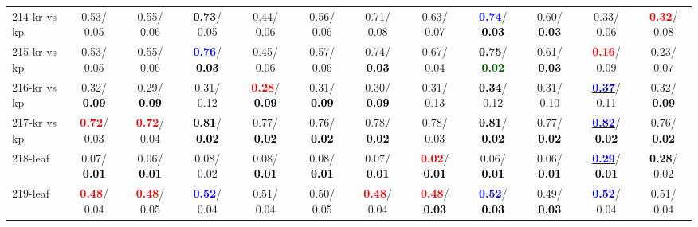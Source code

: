 \begin{table}[h]
\begin{center}
{\begin{tabular}{lc|c|c|c|c|c|c|c|c|c|c}
214-kr vs kp &   0.53/  0.05 &   0.55/  0.06 & \textcolor{black}{\textbf{  0.73}}/  0.05 &   0.44/  0.06 &   0.56/  0.06 &   0.71/  0.08 &   0.63/  0.07 & \underline{\textcolor{blue}{\textbf{  0.74}}}/\textcolor{black}{\textbf{  0.03}} &   0.60/\textcolor{black}{\textbf{  0.03}} &   0.33/  0.06 & \textcolor{red}{\textbf{  0.32}}/  0.08 \\
215-kr vs kp &   0.53/  0.05 &   0.55/  0.06 & \underline{\textcolor{blue}{\textbf{  0.76}}}/\textcolor{black}{\textbf{  0.03}} &   0.45/  0.06 &   0.57/  0.06 &   0.74/\textcolor{black}{\textbf{  0.03}} &   0.67/  0.04 & \textcolor{black}{\textbf{  0.75}}/\textcolor{darkgreen}{\textbf{  0.02}} &   0.61/\textcolor{black}{\textbf{  0.03}} & \textcolor{red}{\textbf{  0.16}}/  0.09 &   0.23/  0.07 \\
216-kr vs kp &   0.32/\textcolor{black}{\textbf{  0.09}} &   0.29/\textcolor{black}{\textbf{  0.09}} &   0.31/  0.12 & \textcolor{red}{\textbf{  0.28}}/\textcolor{black}{\textbf{  0.09}} &   0.31/\textcolor{black}{\textbf{  0.09}} &   0.30/\textcolor{black}{\textbf{  0.09}} &   0.31/  0.13 & \textcolor{black}{\textbf{  0.34}}/  0.12 &   0.31/  0.10 & \underline{\textcolor{blue}{\textbf{  0.37}}}/  0.11 &   0.32/\textcolor{black}{\textbf{  0.09}} \\
217-kr vs kp & \textcolor{red}{\textbf{  0.72}}/  0.03 & \textcolor{red}{\textbf{  0.72}}/  0.04 & \textcolor{black}{\textbf{  0.81}}/\textcolor{black}{\textbf{  0.02}} &   0.77/\textcolor{black}{\textbf{  0.02}} &   0.76/\textcolor{black}{\textbf{  0.02}} &   0.78/\textcolor{black}{\textbf{  0.02}} &   0.78/  0.03 & \textcolor{black}{\textbf{  0.81}}/\textcolor{black}{\textbf{  0.02}} &   0.77/\textcolor{black}{\textbf{  0.02}} & \underline{\textcolor{blue}{\textbf{  0.82}}}/\textcolor{black}{\textbf{  0.02}} &   0.76/\textcolor{black}{\textbf{  0.02}} \\
218-leaf &   0.07/\textcolor{black}{\textbf{  0.01}} &   0.06/\textcolor{black}{\textbf{  0.01}} &   0.08/  0.02 &   0.08/\textcolor{black}{\textbf{  0.01}} &   0.08/\textcolor{black}{\textbf{  0.01}} &   0.07/\textcolor{black}{\textbf{  0.01}} & \textcolor{red}{\textbf{  0.02}}/\textcolor{black}{\textbf{  0.01}} &   0.06/\textcolor{black}{\textbf{  0.01}} &   0.06/\textcolor{black}{\textbf{  0.01}} & \underline{\textcolor{blue}{\textbf{  0.29}}}/\textcolor{black}{\textbf{  0.01}} & \textcolor{black}{\textbf{  0.28}}/  0.02 \\
219-leaf & \textcolor{red}{\textbf{  0.48}}/  0.04 & \textcolor{red}{\textbf{  0.48}}/  0.05 & \textcolor{blue}{\textbf{  0.52}}/  0.04 &   0.51/  0.04 &   0.50/  0.05 & \textcolor{red}{\textbf{  0.48}}/  0.04 & \textcolor{red}{\textbf{  0.48}}/\textcolor{black}{\textbf{  0.03}} & \textcolor{blue}{\textbf{  0.52}}/\textcolor{black}{\textbf{  0.03}} &   0.49/\textcolor{black}{\textbf{  0.03}} & \textcolor{blue}{\textbf{  0.52}}/  0.04 &   0.51/  0.04 \\

\end{tabular}}
\end{center}
\end{table}
